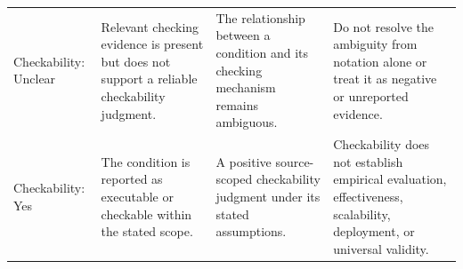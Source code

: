 \begin{longtable}{@{}p{.15\linewidth}p{.27\linewidth}p{.25\linewidth}p{.27\linewidth}@{}}
Checkability: Unclear & Relevant checking evidence is present but does not support a reliable checkability judgment. & The relationship between a condition and its checking mechanism remains ambiguous. & Do not resolve the ambiguity from notation alone or treat it as negative or unreported evidence.\\
Checkability: Yes & The condition is reported as executable or checkable within the stated scope. & A positive source-scoped checkability judgment under its stated assumptions. & Checkability does not establish empirical evaluation, effectiveness, scalability, deployment, or universal validity.\\
\end{longtable}
\endgroup
